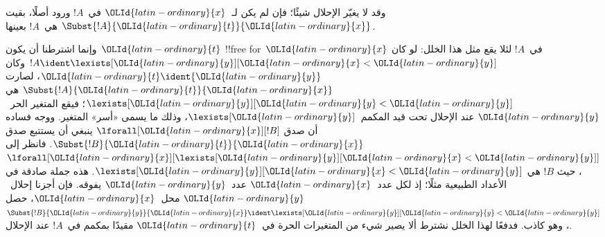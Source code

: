 \documentclass[../../../include/open-logic-section]{subfiles}
\begin{document}
\begin{defn}
\begin{enumerate}


\end{enumerate}
\end{defn}

\begin{explain}
وقد لا يغيّر الإحلال شيئًا؛ فإن لم يكن لـ~${\OLId{latin-ordinary}{x}}$ في~$!A$ ورود أصلًا،
بقيت $\Subst{!A}{{\OLId{latin-ordinary}{t}}}{{\OLId{latin-ordinary}{x}}}$ هي~$!A$ بعينها.

وإنما اشترطنا أن يكون~${\OLId{latin-ordinary}{t}}$ !!{free for}~${\OLId{latin-ordinary}{x}}$ في~$!A$ لئلا يقع
مثل هذا الخلل: لو كان $!A \ident \lexists[{\OLId{latin-ordinary}{y}}][{\OLId{latin-ordinary}{x}} < {\OLId{latin-ordinary}{y}}]$ وكان ${\OLId{latin-ordinary}{t}} \ident {\OLId{latin-ordinary}{y}}$،
لصارت $\Subst{!A}{{\OLId{latin-ordinary}{t}}}{{\OLId{latin-ordinary}{x}}}$ هي $\lexists[{\OLId{latin-ordinary}{y}}][{\OLId{latin-ordinary}{y}} < {\OLId{latin-ordinary}{y}}]$؛ فيقع المتغير
الحر~${\OLId{latin-ordinary}{y}}$ عند الإحلال تحت قيد المكمم~$\lexists[{\OLId{latin-ordinary}{y}}]$، وذلك ما يسمى
«أسر» المتغير. ووجه فساده أن صدق $\lforall[{\OLId{latin-ordinary}{x}}][!B]$ ينبغي أن يستتبع
صدق $\Subst{!B}{{\OLId{latin-ordinary}{t}}}{{\OLId{latin-ordinary}{x}}}$. فانظر إلى
$\lforall[{\OLId{latin-ordinary}{x}}][\lexists[{\OLId{latin-ordinary}{y}}][{\OLId{latin-ordinary}{x}} < {\OLId{latin-ordinary}{y}}]]$، حيث $!B$ هي $\lexists[{\OLId{latin-ordinary}{y}}][{\OLId{latin-ordinary}{x}} <
  {\OLId{latin-ordinary}{y}}]$. هذه جملة صادقة في الأعداد الطبيعية مثلًا؛ إذ لكل عدد~${\OLId{latin-ordinary}{x}}$
عدد~${\OLId{latin-ordinary}{y}}$ يفوقه. فإن أجزنا إحلال~${\OLId{latin-ordinary}{y}}$ محل~${\OLId{latin-ordinary}{x}}$، حصل
$\Subst{!B}{{\OLId{latin-ordinary}{y}}}{{\OLId{latin-ordinary}{x}}} \ident \lexists[{\OLId{latin-ordinary}{y}}][{\OLId{latin-ordinary}{y}} < {\OLId{latin-ordinary}{y}}]$، وهو كاذب.
فدفعًا لهذا الخلل نشترط ألا يصير شيء من المتغيرات الحرة في~${\OLId{latin-ordinary}{t}}$
مقيدًا بمكمم في~$!A$ عند الإحلال.
\end{explain}
\end{document}
